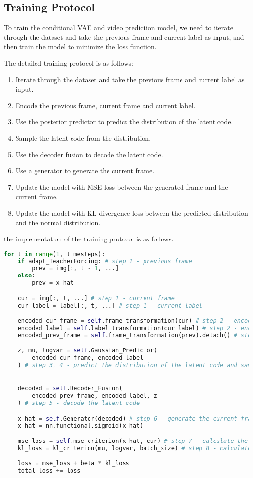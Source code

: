\subsection{Training Protocol}
To train the conditional VAE and video prediction model, we need to iterate through the dataset and take the previous frame and current label as input, and then train the model to minimize the loss function.

The detailed training protocol is as follows:
\begin{enumerate}
    \item Iterate through the dataset and take the previous frame and current label as input.
    \item Encode the previous frame, current frame and current label.
    \item Use the posterior predictor to predict the distribution of the latent code.
    \item Sample the latent code from the distribution.
    \item Use the decoder fusion to decode the latent code.
    \item Use a generator to generate the current frame.
    \item Update the model with MSE loss between the generated frame and the current frame.
    \item Update the model with KL divergence loss between the predicted distribution and the normal distribution.
\end{enumerate}

the implementation of the training protocol is as follows:

\begin{lstlisting}[language=Python]
for t in range(1, timesteps):
    if adapt_TeacherForcing: # step 1 - previous frame
        prev = img[:, t - 1, ...]
    else:
        prev = x_hat

    cur = img[:, t, ...] # step 1 - current frame
    cur_label = label[:, t, ...] # step 1 - current label

    encoded_cur_frame = self.frame_transformation(cur) # step 2 - encoded current frame
    encoded_label = self.label_transformation(cur_label) # step 2 - encoded current label
    encoded_prev_frame = self.frame_transformation(prev).detach() # step 2 - encoded previous frame

    z, mu, logvar = self.Gaussian_Predictor(
        encoded_cur_frame, encoded_label
    ) # step 3, 4 - predict the distribution of the latent code and sample a latent code


    decoded = self.Decoder_Fusion(
        encoded_prev_frame, encoded_label, z
    ) # step 5 - decode the latent code

    x_hat = self.Generator(decoded) # step 6 - generate the current frame
    x_hat = nn.functional.sigmoid(x_hat)

    mse_loss = self.mse_criterion(x_hat, cur) # step 7 - calculate the MSE loss
    kl_loss = kl_criterion(mu, logvar, batch_size) # step 8 - calculate the KL divergence loss

    loss = mse_loss + beta * kl_loss
    total_loss += loss
\end{lstlisting}

